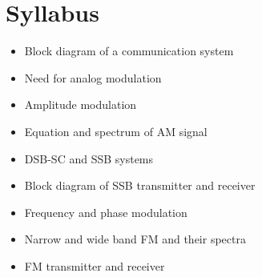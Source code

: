 \documentclass[../course]{subfiles}
\begin{document}
\section{Syllabus}

\begin{itemize}
    \item Block diagram of a communication system
    \item Need for analog modulation
    \item Amplitude modulation
    \item Equation and spectrum of AM signal
    \item DSB-SC and SSB systems
    \item Block diagram of SSB transmitter and receiver
    \item Frequency and phase modulation
    \item Narrow and wide band FM and their spectra
    \item FM transmitter and receiver
\end{itemize}
\end{document}
